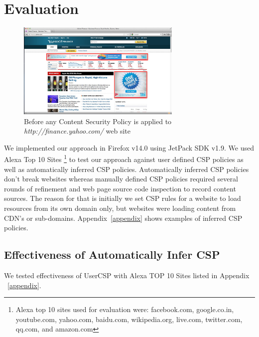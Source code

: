 \section{Evaluation}
\label{sec:eval}

\begin{figure}[!ht]
\begin{center}
\includegraphics[width=0.7\textwidth]{before-csp23}
\end{center}
\caption{Before any Content Security Policy is applied to {\it http://finance.yahoo.com/} web site}
\label{fig:beforeCSP}
\end{figure}

We implemented our approach in Firefox v14.0 using JetPack SDK
v1.9. We used Alexa Top 10 Sites \footnote[2]{Alexa top 10 sites used
  for evaluation were: facebook.com, google.co.in, youtube.com,
  yahoo.com, baidu.com, wikipedia.org, live.com, twitter.com, qq.com,
  and amazon.com} to test our approach against user defined CSP
policies as well as automatically inferred CSP policies. Automatically
inferred CSP policies don't break websites whereas manually defined
CSP policies required several rounds of refinement and web page source
code inspection to record content sources. The reason for that is
initially we set CSP rules for a website to load resources from its
own domain only, but websites were loading content from CDN's or
sub-domains. Appendix~\ref{appendix} shows examples of inferred CSP
policies.

\subsection{Effectiveness of Automatically Infer CSP}
We tested effectiveness of UserCSP with Alexa TOP 10 Sites listed in
Appendix ~\ref{appendix}.


